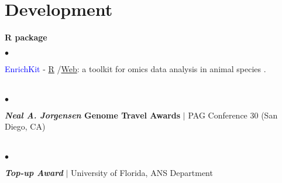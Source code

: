 \documentclass[margin,line,10pt]{res}
\newenvironment{list1}{
  \begin{list}{\ding{113}}{%
      \setlength{\itemsep}{0in}
      \setlength{\parsep}{0in} \setlength{\parskip}{0in}
      \setlength{\topsep}{0in} \setlength{\partopsep}{0in} 
      \setlength{\leftmargin}{0.17in}}}{\end{list}}
\newenvironment{list2}{
  \begin{list}{$\bullet$}{%
      \setlength{\itemsep}{0in}
      \setlength{\parsep}{0in} \setlength{\parskip}{0in}
      \setlength{\topsep}{0in} \setlength{\partopsep}{0in} 
      \setlength{\leftmargin}{0.2in}}}{\end{list}}
\begin{document}
\begin{resume}
\section{ \phantom{1cm} {\bf Development}}
\textbf {R package}\\
\vspace*{-.15in}
\begin{list1}
\item[]
\begin{list2}
\vspace*{.05in}
\item \textcolor{blue}{EnrichKit} - \textcolor{blue}{\href{https://github.com/liulihe954/EnrichKit}{R}} /\textcolor{blue}{\href{https://github.com/liulihe954/EnrichKitWeb}{Web}}: a toolkit for omics data analysis in animal species . 

\vspace*{-.15in}
\end{list2}
\end{list1}


\vspace*{.1in}

\section{}
\vspace{.6cm}

\section{}
\begin{list1}
\item[]
\begin{list2}
\item \textbf{\textit{Neal A. Jorgensen} Genome Travel Awards} $|$ PAG Conference 30 (San Diego, CA)
\end{list2}
\end{list1}
\vspace*{-.15in}



\section{}
\begin{list1}
\item[]
\begin{list2}
\item \textbf{\textit{Top-up Award}} $|$ University of Florida, ANS Department
\end{list2}
\end{list1}
\vspace*{-.15in}


\end{resume}
\end{document}
